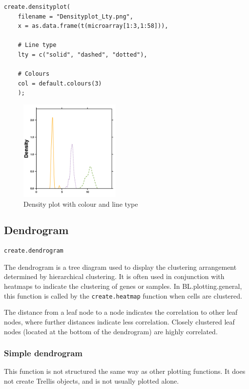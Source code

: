 \documentclass[letterpaper]{article}
\begin{document}
\begin{verbatim}
create.densityplot(
    filename = "Densityplot_Lty.png",
    x = as.data.frame(t(microarray[1:3,1:58])),
    
    # Line type
    lty = c("solid", "dashed", "dotted"),
    
    # Colours
    col = default.colours(3)
    );
\end{verbatim}

\begin{figure}[!ht]
  \begin{center}
     \includegraphics[width=50mm]{Figures/Densityplot_Lty.png}
     \caption{Density plot with colour and line type}
  \end{center}
\end{figure}

\subsection{Dendrogram}
\begin{verbatim}
create.dendrogram
\end{verbatim}

The dendrogram is a tree diagram used to display the clustering arrangement determined by hierarchical clustering. It is often used in conjunction with heatmaps to indicate the clustering of genes or samples. In BL.plotting.general, this function is called by the \verb|create.heatmap| function when cells are clustered.

The distance from a leaf node to a node indicates the correlation to other leaf nodes, where further distances indicate less correlation. Closely clustered leaf nodes (located at the bottom of the dendrogram) are highly correlated.

\subsubsection{Simple dendrogram}
This function is not structured the same way as other plotting functions. It does not create Trellis objects, and is not usually plotted alone.
\end{document}
